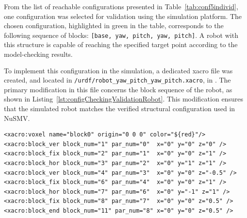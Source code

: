 

From the list of reachable configurations presented in Table~\ref{tab:conf5individ}, 
one configuration was selected for validation using the simulation platform. 
The chosen configuration, highlighted in green in the table, corresponds to 
the following sequence of blocks:
\texttt{[base, yaw, pitch, yaw, pitch]}. 
A robot with this structure is capable of reaching the specified target 
point according to the model-checking results.

To implement this configuration in the simulation, a dedicated 
xacro file was created, and located in 
\texttt{/urdf/robot\_yaw\_pitch\_yaw\_pitch.xacro}, in \cite{GitHub}. 
The primary modification in this file concerns the block sequence of the robot, 
as shown in Listing~\ref{lst:configCheckingValidationRobot}. 
This modification ensures that the simulated robot matches
the verified structural configuration used in NuSMV.

\begin{lstlisting}[language=NuSMV, caption={Function goto\_XYZ() of RobotController class}, 
    label={lst:configCheckingValidationRobot}]
<xacro:voxel name="block0" origin="0 0 0" color="${red}"/>
<xacro:block_ver block_num="1" par_num="0"  x="0" y="0" z="0" />
<xacro:block_fix block_num="2" par_num="1"  x="0" y="0" z="1" />
<xacro:block_hor block_num="3" par_num="2"  x="0" y="1" z="1" />
<xacro:block_ver block_num="4" par_num="3"  x="0" y="0" z="-0.5" />
<xacro:block_fix block_num="6" par_num="4"  x="0" y="0" z="1" />
<xacro:block_hor block_num="7" par_num="6"  x="0" y="-1" z="1" />
<xacro:block_fix block_num="8" par_num="7"  x="0" y="0" z="0.5" />
<xacro:block_end block_num="11" par_num="8" x="0" y="0" z="0.5" />
\end{lstlisting}

